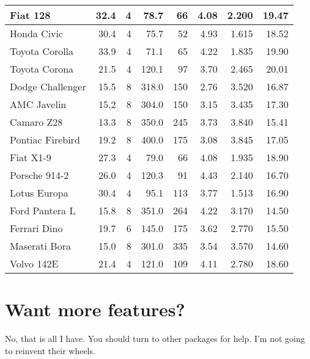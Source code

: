 \documentclass{article}\usepackage[]{graphicx}\usepackage[]{color}
\begin{document}
\begin{longtable}{lrrrrrrr}
\midrule
Fiat 128 & 32.4 & 4 &  78.7 &  66 & 4.08 & 2.200 & 19.47\\
\midrule
Honda Civic & 30.4 & 4 &  75.7 &  52 & 4.93 & 1.615 & 18.52\\
\midrule
Toyota Corolla & 33.9 & 4 &  71.1 &  65 & 4.22 & 1.835 & 19.90\\
\midrule
Toyota Corona & 21.5 & 4 & 120.1 &  97 & 3.70 & 2.465 & 20.01\\
\midrule
Dodge Challenger & 15.5 & 8 & 318.0 & 150 & 2.76 & 3.520 & 16.87\\
\midrule
AMC Javelin & 15.2 & 8 & 304.0 & 150 & 3.15 & 3.435 & 17.30\\
\midrule
Camaro Z28 & 13.3 & 8 & 350.0 & 245 & 3.73 & 3.840 & 15.41\\
\midrule
Pontiac Firebird & 19.2 & 8 & 400.0 & 175 & 3.08 & 3.845 & 17.05\\
\midrule
Fiat X1-9 & 27.3 & 4 &  79.0 &  66 & 4.08 & 1.935 & 18.90\\
\midrule
Porsche 914-2 & 26.0 & 4 & 120.3 &  91 & 4.43 & 2.140 & 16.70\\
\midrule
Lotus Europa & 30.4 & 4 &  95.1 & 113 & 3.77 & 1.513 & 16.90\\
\midrule
Ford Pantera L & 15.8 & 8 & 351.0 & 264 & 4.22 & 3.170 & 14.50\\
\midrule
Ferrari Dino & 19.7 & 6 & 145.0 & 175 & 3.62 & 2.770 & 15.50\\
\midrule
Maserati Bora & 15.0 & 8 & 301.0 & 335 & 3.54 & 3.570 & 14.60\\
\midrule
Volvo 142E & 21.4 & 4 & 121.0 & 109 & 4.11 & 2.780 & 18.60\\
\bottomrule
\end{longtable}



\section{Want more features?}

No, that is all I have. You should turn to other packages for help. I'm not
going to reinvent their wheels.
\end{document}
